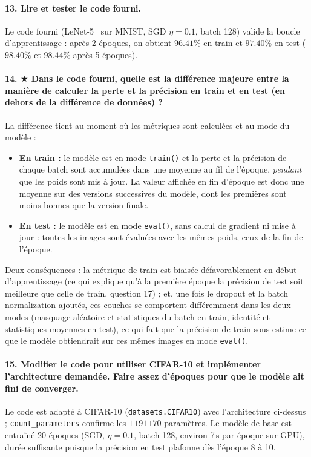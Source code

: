 \documentclass{report}
\begin{document}
\paragraph{13. Lire et tester le code fourni.}
 Le code fourni (LeNet-5~\cite{lecun1998} sur MNIST, SGD $\eta = 0.1$, batch 128) valide la boucle d'apprentissage : après 2 époques, on obtient $96.41\%$ en train et $97.40\%$ en test ($98.40\%$ et $98.44\%$ après 5 époques).

\paragraph{14. $\bigstar$ Dans le code fourni, quelle est la différence majeure entre la manière de calculer la perte et la précision en train et en test (en dehors de la différence de données) ?}
 La différence tient au moment où les métriques sont calculées et au mode du modèle :
\begin{itemize}
    \item \textbf{En train :} le modèle est en mode \texttt{train()} et la perte et la précision de chaque batch sont accumulées dans une moyenne au fil de l'époque, \textit{pendant} que les poids sont mis à jour. La valeur affichée en fin d'époque est donc une moyenne sur des versions successives du modèle, dont les premières sont moins bonnes que la version finale.
    \item \textbf{En test :} le modèle est en mode \texttt{eval()}, sans calcul de gradient ni mise à jour : toutes les images sont évaluées avec les mêmes poids, ceux de la fin de l'époque.
\end{itemize}
Deux conséquences : la métrique de train est biaisée défavorablement en début d'apprentissage (ce qui explique qu'à la première époque la précision de test soit meilleure que celle de train, question 17) ; et, une fois le dropout et la batch normalization ajoutés, ces couches se comportent différemment dans les deux modes (masquage aléatoire et statistiques du batch en train, identité et statistiques moyennes en test), ce qui fait que la précision de train sous-estime ce que le modèle obtiendrait sur ces mêmes images en mode \texttt{eval()}.

\paragraph{15. Modifier le code pour utiliser CIFAR-10 et implémenter l'architecture demandée. Faire assez d'époques pour que le modèle ait fini de converger.}
 Le code est adapté à CIFAR-10 (\texttt{datasets.CIFAR10}) avec l'architecture ci-dessus ; \texttt{count\_parameters} confirme les $1\,191\,170$ paramètres. Le modèle de base est entraîné 20 époques (SGD, $\eta = 0.1$, batch 128, environ 7\,s par époque sur GPU), durée suffisante puisque la précision en test plafonne dès l'époque 8 à 10.
\end{document}
